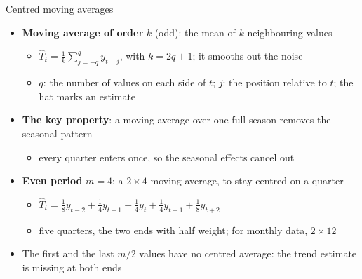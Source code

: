 \begin{frame}{Centred moving averages}
\itemsize{\small}
\begin{itemize}
    \item \textbf{Moving average of order} $k$ (odd): the mean of $k$ neighbouring values
    \begin{itemize}
        \item $\hat T_t = \frac{1}{k} \sum_{j=-q}^{q} y_{t+j}$, with $k = 2q + 1$; it smooths out the noise
        \item $q$: the number of values on each side of $t$; $j$: the position relative to $t$; the hat marks an estimate
    \end{itemize}
    \item \textbf{The key property}: a moving average over one full season removes the seasonal pattern
    \begin{itemize}
        \item every quarter enters once, so the seasonal effects cancel out
    \end{itemize}
    \item \textbf{Even period} $m = 4$: a $2 \times 4$ moving average, to stay centred on a quarter
    \begin{itemize}
        \item $\hat T_t = \frac{1}{8} y_{t-2} + \frac{1}{4} y_{t-1} + \frac{1}{4} y_t + \frac{1}{4} y_{t+1} + \frac{1}{8} y_{t+2}$
        \item five quarters, the two ends with half weight; for monthly data, $2 \times 12$
    \end{itemize}
    \item The first and the last $m/2$ values have no centred average: the trend estimate is missing at both ends
\end{itemize}
\end{frame}

